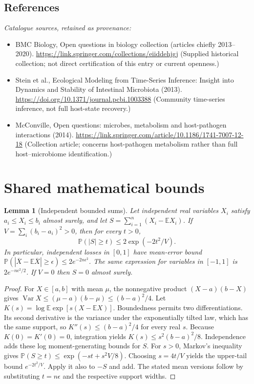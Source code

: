 \documentclass[11pt]{article}
\newcommand{\E}{\mathbb E}
\newcommand{\Prob}{\mathbb P}
\DeclareMathOperator{\Var}{Var}
\providecommand{\E}{\mathbb E}
\providecommand{\Prob}{\mathbb P}
\providecommand{\Var}{\operatorname{Var}}
\newtheorem{sharedlemma}{Lemma}[section]
\begin{document}
\subsection{References}
\noindent\emph{Catalogue sources, retained as provenance:}
\begin{itemize}
\item BMC Biology, Open questions in biology collection (articles chiefly 2013--2020). \url{https://link.springer.com/collections/eiiddehjgj} (Supplied historical collection; not direct certification of this entry or current openness.)
\item Stein et al., Ecological Modeling from Time-Series Inference: Insight into Dynamics and Stability of Intestinal Microbiota (2013). \url{https://doi.org/10.1371/journal.pcbi.1003388} (Community time-series inference, not full host-state recovery.)
\item McConville, Open questions: microbes, metabolism and host-pathogen interactions (2014). \url{https://link.springer.com/article/10.1186/1741-7007-12-18} (Collection article; concerns host-pathogen metabolism rather than full host--microbiome identification.)
\end{itemize}
\clearpage


\appendix
\section{Shared mathematical bounds}\label{app:bounds}
\begin{sharedlemma}[Independent bounded sums]\label{lem:bounded}
Let independent real variables $X_i$ satisfy $a_i\leq X_i\leq b_i$ almost surely,
and let $S=\sum_{i=1}^n(X_i-\E X_i)$. If
$V=\sum_i(b_i-a_i)^2>0$, then for every $t>0$,
\[
 \Prob(|S|\geq t)\leq 2\exp(-2t^2/V).
\]
In particular, independent losses in $[0,1]$ have mean-error bound
$\Prob(|\overline X-\E\overline X|\geq\epsilon)
\leq2e^{-2n\epsilon^2}$. The same expression for variables in $[-1,1]$
is $2e^{-n\epsilon^2/2}$. If $V=0$ then $S=0$ almost surely.
\end{sharedlemma}
\begin{proof}
For $X\in[a,b]$ with mean $\mu$, the nonnegative product
$(X-a)(b-X)$ gives
$\Var X\leq(\mu-a)(b-\mu)\leq(b-a)^2/4$.
Let $K(s)=\log\E\exp[s(X-\E X)]$.
Boundedness permits two differentiations. Its second derivative is the variance
under the exponentially tilted law, which has the same support, so
$K''(s)\leq(b-a)^2/4$ for every real $s$.
Because $K(0)=K'(0)=0$, integration yields
$K(s)\leq s^2(b-a)^2/8$.
Independence adds these log moment-generating bounds for $S$.
For $s>0$, Markov's inequality gives
$\Prob(S\geq t)\leq\exp(-st+s^2V/8)$.
Choosing $s=4t/V$ yields the upper-tail bound $e^{-2t^2/V}$.
Apply it also to $-S$ and add. The stated mean versions follow by substituting
$t=n\epsilon$ and the respective support widths.
\end{proof}
\end{document}
